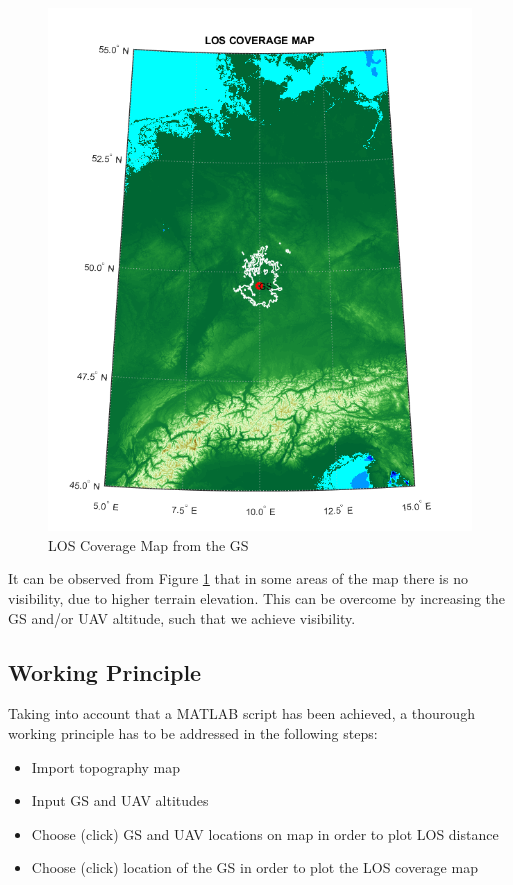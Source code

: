 \begin{figure}[h]
	\centering
	\includegraphics[scale=0.5]{figures/gs_coverage_map.png}
	\caption{LOS Coverage Map from the GS}
   	\label{fig:los_area}
\end{figure}

It can be observed from Figure \ref{fig:los_area} that in some areas of the map there is no visibility, due to higher terrain elevation. This can be overcome by increasing the GS and/or UAV altitude, such that we achieve visibility.  

\subsection{Working Principle}
Taking into account that a MATLAB script has been achieved, a thourough working principle has to be addressed in the following steps:
\begin{itemize}
	\item Import topography map 
	\item Input GS and UAV altitudes
	\item Choose (click) GS and UAV locations on map in order to plot LOS distance
	\item Choose (click) location of the GS in order to plot the LOS coverage map
\end{itemize}